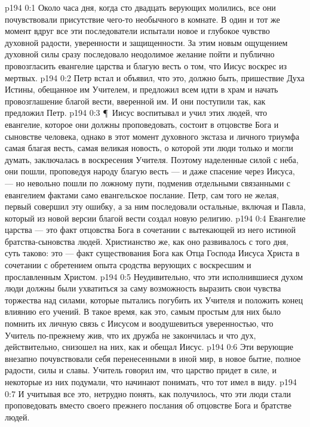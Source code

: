 \author{Комиссия срединников}
\vs p194 0:1 Около часа дня, когда сто двадцать верующих молились, все они почувствовали присутствие чего\hyp{}то необычного в комнате. В один и тот же момент вдруг все эти последователи испытали новое и глубокое чувство духовной радости, уверенности и защищенности. За этим новым ощущением духовной силы сразу последовало неодолимое желание пойти и публично провозгласить евангелие царства и благую весть о том, что Иисус воскрес из мертвых.
\vs p194 0:2 Петр встал и объявил, что это, должно быть, пришествие Духа Истины, обещанное им Учителем, и предложил всем идти в храм и начать провозглашение благой вести, вверенной им. И они поступили так, как предложил Петр.
\vs p194 0:3 \P\ Иисус воспитывал и учил этих людей, что евангелие, которое они должны проповедовать, состоит в отцовстве Бога и сыновстве человека, однако в этот момент духовного экстаза и личного триумфа самая благая весть, самая великая новость, о которой эти люди только и могли думать, заключалась в  воскресения Учителя. Поэтому наделенные силой с неба, они пошли, проповедуя народу благую весть --- и даже спасение через Иисуса, --- но невольно пошли по ложному пути, подменив отдельными связанными с евангелием фактами само евангельское послание. Петр, сам того не желая, первый совершил эту ошибку, а за ним последовали остальные, включая и Павла, который из новой версии благой вести создал новую религию.
\vs p194 0:4 Евангелие царства --- это факт отцовства Бога в сочетании с вытекающей из него истиной братства\hyp{}сыновства людей. Христианство же, как оно развивалось с того дня, суть таково: это --- факт существования Бога как Отца Господа Иисуса Христа в сочетании с обретением опыта сродства верующих с воскресшим и прославленным Христом.
\vs p194 0:5 Неудивительно, что эти исполнившиеся духом люди должны были ухватиться за саму возможность выразить свои чувства торжества над силами, которые пытались погубить их Учителя и положить конец влиянию его учений. В такое время, как это, самым простым для них было помнить их личную связь с Иисусом и воодушевиться уверенностью, что Учитель по\hyp{}прежнему жив, что их дружба не закончилась и что дух, действительно, снизошел на них, как и обещал Иисус.
\vs p194 0:6 Эти верующие внезапно почувствовали себя перенесенными в иной мир, в новое бытие, полное радости, силы и славы. Учитель говорил им, что царство придет в силе, и некоторые из них подумали, что начинают понимать, что тот имел в виду.
\vs p194 0:7 И учитывая все это, нетрудно понять, как получилось, что эти люди стали проповедовать  вместо своего прежнего послания об отцовстве Бога и братстве людей.
